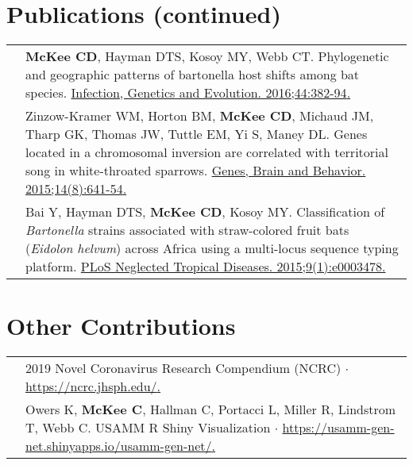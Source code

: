 \documentclass[letterpaper]{deedy-resume} %
\newcommand{\spread}{\vspace{1mm}}
\begin{document}
\section{Publications (continued)}
\begin{tabular}{>{\raggedright\arraybackslash}p{2cm}p{16cm}}

2016 & \textbf{McKee CD}, Hayman DTS, Kosoy MY, Webb CT. Phylogenetic and geographic patterns of bartonella host shifts among bat species. \href{https://doi.org/10.1016/j.meegid.2016.07.033}{\textcolor{special}{Infection, Genetics and Evolution. 2016;44:382-94}.} \spread \\

2015 & Zinzow-Kramer WM, Horton BM, \textbf{McKee CD}, Michaud JM, Tharp GK, Thomas JW, Tuttle EM, Yi S, Maney DL. Genes located in a chromosomal inversion are correlated with territorial song in white-throated sparrows. \href{https://doi.org/10.1111/gbb.12252}{\textcolor{special}{Genes, Brain and Behavior. 2015;14(8):641-54}.} \spread \\

2015 & Bai Y, Hayman DTS, \textbf{McKee CD}, Kosoy MY. Classification of \textit{Bartonella} strains associated with straw-colored fruit bats (\textit{Eidolon helvum}) across Africa using a multi-locus sequence typing platform. \href{https://doi.org/10.1371/journal.pntd.0003478}{\textcolor{special}{PLoS Neglected Tropical Diseases. 2015;9(1):e0003478}.} \spread \\

\end{tabular}
\sectionspace


\section{Other Contributions}
\begin{tabular}{>{\raggedright\arraybackslash}p{2cm}p{16cm}}
2021 & 2019 Novel Coronavirus Research Compendium (NCRC) $\cdot$ \href{https://ncrc.jhsph.edu/}{\textcolor{special}{https://ncrc.jhsph.edu/}.} \spread \\

2015 & Owers K, \textbf{McKee C}, Hallman C, Portacci L, Miller R, Lindstrom T, Webb C. USAMM R Shiny Visualization $\cdot$ \href{https://usamm-gen-net.shinyapps.io/usamm-gen-net/}{\textcolor{special}{https://usamm-gen-net.shinyapps.io/usamm-gen-net/}.} \spread \\
\end{tabular}
\sectionspace
\end{document}
